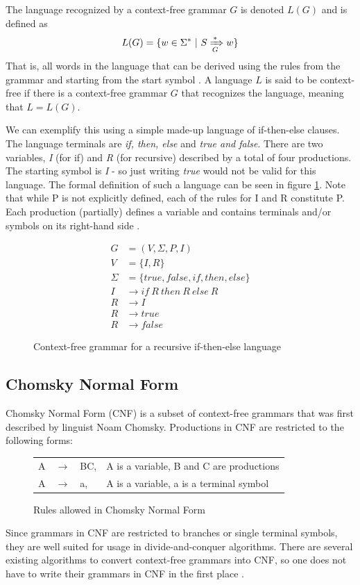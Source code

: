 \documentclass[a4paper,12pt,twosided]{report}
\begin{document}
The language recognized by a context-free grammar $G$ is denoted $L(G)$ and is
defined as 
\[
L(G) = \{w \in \Sigma^* \ |\  S \xRightarrow[G]{*} w\}
\]
That is, all words in the language that can be derived using the rules from the
grammar and starting from the start symbol \cite[p. 177]{automatabook}.  A
language $L$ is said to be context-free if there is a context-free grammar $G$
that recognizes the language, meaning that $L = L(G)$.

We can exemplify this using a simple made-up language of if-then-else clauses.
The language terminals are \textit{if, then, else} and \textit{true and false}.
There are two variables, \textit{I} (for if) and \textit{R} (for recursive)
described by a total of four productions. The starting symbol is \textit{I} - so
just writing \textit{true} would not be valid for this language. The formal
definition of such a language can be seen in figure \ref{iflang}. Note that
while P is not explicitly defined, each of the rules for I and R constitute P.
Each production (partially) defines a variable and contains terminals and/or
symbols on its right-hand side \cite[p.171]{automatabook}.

\begin{figure}[H]
\begin{align*}
G &= (V, \Sigma , P, I) \\
V &= \{I,R\} \\
\Sigma &= \{true,false,if,then,else\} \\
I &\rightarrow if\ R\ then\ R\ else\ R \\
R &\rightarrow I \\
R &\rightarrow true \\
R &\rightarrow false
\end{align*}
\caption{Context-free grammar for a recursive if-then-else language}
\label{iflang}
\end{figure}

\subsection{Chomsky Normal Form}
Chomsky Normal Form (CNF) is a subset of context-free grammars that was first
described by linguist Noam Chomsky. Productions in CNF are restricted to the
following forms:

\begin{figure}[H]
\begin{tabular}{l l l l}
    A & $\rightarrow$ & BC, & A is a variable, B and C are productions \\
    A & $\rightarrow$ & a, & A is a variable, a is a terminal symbol \\
\end{tabular}
\caption{Rules allowed in Chomsky Normal Form}
\end{figure}
Since grammars in CNF are restricted to branches or single terminal symbols,
they are well suited for usage in divide-and-conquer algorithms. There are
several existing algorithms to convert context-free grammars into CNF, so one
does not have to write their grammars in CNF in the first place \cite{langeleiss}.
\end{document}
